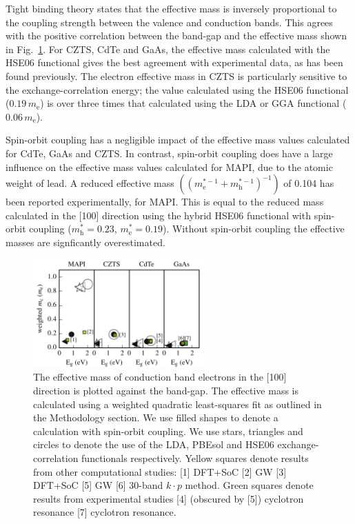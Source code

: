 Tight binding theory states that the effective mass is inversely proportional to the coupling strength between the valence and conduction bands.\autocite{Kittel2005} 
This agrees with the positive correlation between the band-gap and the effective mass shown in Fig.\ \ref{m*_bandgap_plot}.
For CZTS, CdTe and GaAs, the effective mass calculated with the HSE06 functional gives the best agreement with experimental data, as has been found previously.\autocite{Kim2010} 
The electron effective mass in CZTS is particularly sensitive to the exchange-correlation energy; the value calculated using the HSE06 functional ($0.19\,m_{\text{e}}$) is over three times that calculated using the LDA or GGA functional ($0.06\,m_\text{e}$).

Spin-orbit coupling has a negligible impact of the effective mass values calculated for CdTe, GaAs and CZTS.
In contrast, spin-orbit coupling does have a large influence on the effective mass values calculated for MAPI, due to the atomic weight of lead. 
A reduced effective mass $((m^{*-1}_{\text{e}}+m^{*-1}_{\text{h}})^{-1})$ of 0.104 has been reported experimentally,\autocite{Miyata2015} for MAPI.
This is equal to the reduced mass calculated in the [100] direction using the hybrid HSE06 functional with spin-orbit coupling ($m^*_{\text{h}}=0.23$, $m^*_{\text{e}}=0.19$). 
Without spin-orbit coupling the effective masses are signficantly overestimated. 

\begin{figure}[tb] \centering
\includegraphics[width=0.6\textwidth]{./figures/ch4/m__bandgap_plot.pdf}
\caption[Effective mass and band-gap]{\label{m*_bandgap_plot}The effective mass of conduction band electrons in the [100] direction is plotted against the band-gap. The effective mass is calculated using a weighted quadratic least-squares fit as outlined in the Methodology section. We use filled shapes to denote a calculation with spin-orbit coupling. We use stars, triangles and circles to denote the use of the LDA, PBEsol and HSE06 exchange-correlation functionals respectively. Yellow squares denote results from other computational studies: [1] DFT+SoC\autocite{Filip2015} [2] GW\autocite{Filip2015} [3] DFT+SoC\autocite{Liu2012} [5] GW\autocite{Deguchi2016}  [6] 30-band $k\cdot p$ method.\autocite{Richard2004} Green squares denote results from experimental studies [4] (obscured by [5]) cyclotron resonance\autocite{Madelung2004} [7] cyclotron resonance.\autocite{Madelung2004}}
\end{figure}

